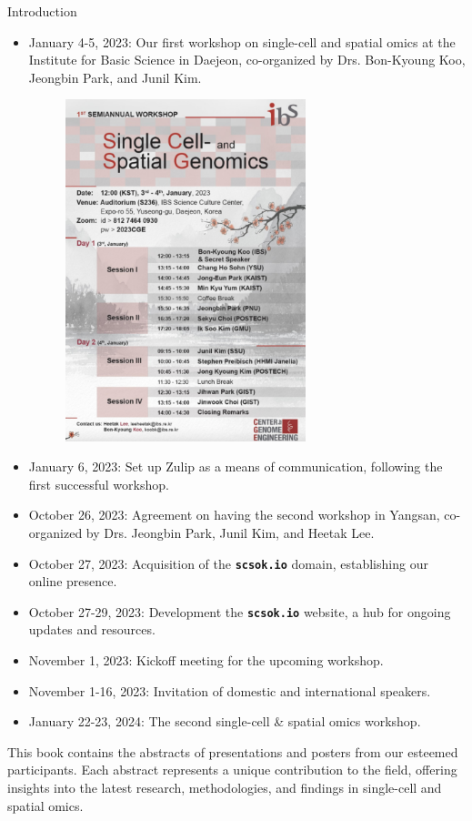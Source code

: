 \begin{coverpage}{Introduction}
{\begin{itemize}[leftmargin=0.5cm, rightmargin=0.5cm]
\item January 4-5, 2023: Our first workshop on single-cell and spatial omics at the Institute for Basic Science in Daejeon, co-organized by Drs. Bon-Kyoung Koo, Jeongbin Park, and Junil Kim.
\begin{figure}[h!]
\includegraphics[width=7cm]{images/poster-1st-workshop.jpg}
\centering
\end{figure}
\item January 6, 2023: Set up Zulip as a means of communication, following the first successful workshop.
\item October 26, 2023: Agreement on having the second workshop in Yangsan, co-organized by Drs. Jeongbin Park, Junil Kim, and Heetak Lee.
\item October 27, 2023: Acquisition of the \textbf{\texttt{scsok.io}} domain, establishing our online presence.
\item October 27-29, 2023: Development the \textbf{\texttt{scsok.io}} website, a hub for ongoing updates and resources.
\item November 1, 2023: Kickoff meeting for the upcoming workshop.
\item November 1-16, 2023: Invitation of domestic and international speakers.
\item January 22-23, 2024: The second single-cell \& spatial omics workshop.
\end{itemize}

This book contains the abstracts of presentations and posters from our esteemed participants. Each abstract represents a unique contribution to the field, offering insights into the latest research, methodologies, and findings in single-cell and spatial omics.
\\
}
\end{coverpage}
